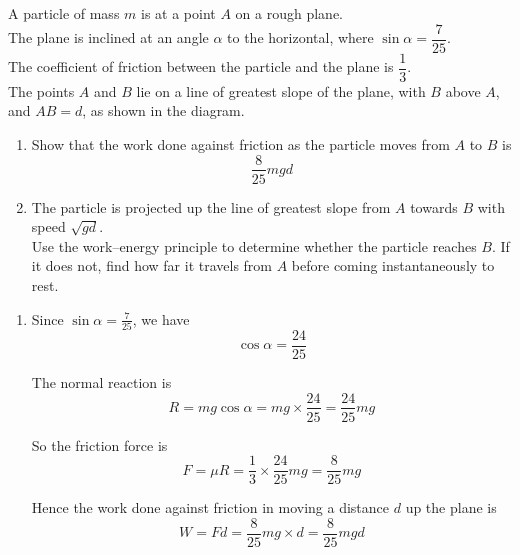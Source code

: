 \documentclass[leqno]{article}
\begin{document}
\begin{enumerate}[
  label=\textbf{\arabic*.},
  leftmargin=*,
  topsep=0pt,
  partopsep=0pt,
  parsep=0pt
]
\begin{figure}[H]
\end{figure}


A particle of mass $m$ is at a point $A$ on a rough plane. \\

The plane is inclined at an angle $\alpha$ to the horizontal, where $\sin\alpha=\dfrac{7}{25}$. \\

The coefficient of friction between the particle and the plane is $\dfrac{1}{3}$. \\

The points $A$ and $B$ lie on a line of greatest slope of the plane, with $B$ above $A$, and $AB=d$, as shown in the diagram. \\

\begin{enumerate}[label=\textbf{(\alph*)}]
  \item Show that the work done against friction as the particle moves from $A$ to $B$ is
  \[
  \dfrac{8}{25}mgd
  \]
  \item The particle is projected up the line of greatest slope from $A$ towards $B$ with speed $\sqrt{gd}$. \\
  Use the work--energy principle to determine whether the particle reaches $B$. If it does not, find how far it travels from $A$ before coming instantaneously to rest.  \\
\end{enumerate}

\vspace*{10pt}

\begin{djsSolution}
\begin{enumerate}[label=\textbf{(\alph*)}]
  \item Since \(\sin\alpha=\frac{7}{25}\), we have
\[
\cos\alpha=\frac{24}{25}
\]

The normal reaction is
\[
R=mg\cos\alpha=mg\times \frac{24}{25}=\frac{24}{25}mg
\]

So the friction force is
\[
F=\mu R=\frac13\times \frac{24}{25}mg=\frac{8}{25}mg
\]

Hence the work done against friction in moving a distance \(d\) up the plane is
\[
W=Fd=\frac{8}{25}mg\times d=\frac{8}{25}mgd
\]


\end{enumerate}
\end{djsSolution}
\end{enumerate}
\end{document}
